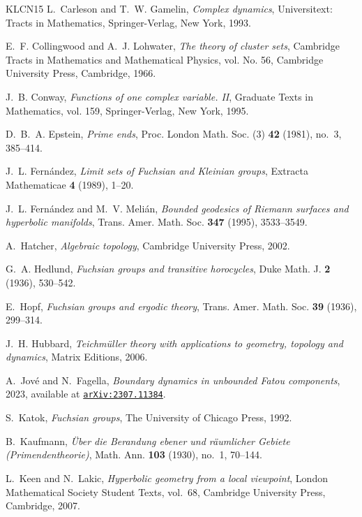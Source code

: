 \documentclass[11pt,a4paper,reqno]{amsart}
\theoremstyle{plain}
\theoremstyle{definition}
\theoremstyle{plain}
\begin{document}
\begin{thebibliography}{KLCN15}
L.~Carleson and T.~W. Gamelin, \emph{Complex dynamics}, Universitext: Tracts in
  Mathematics, Springer-Verlag, New York, 1993.

E.~F. Collingwood and A.~J. Lohwater, \emph{The theory of cluster sets},
  Cambridge Tracts in Mathematics and Mathematical Physics, vol. No. 56,
  Cambridge University Press, Cambridge, 1966.

J.~B. Conway, \emph{Functions of one complex variable. {II}}, Graduate Texts in
  Mathematics, vol. 159, Springer-Verlag, New York, 1995.

D.~B.~A. Epstein, \emph{Prime ends}, Proc. London Math. Soc. (3) \textbf{42}
  (1981), no.~3, 385--414.

J.~L. Fern{\'a}ndez, \emph{Limit sets of {F}uchsian and {K}leinian groups},
  Extracta Mathematicae \textbf{4} (1989), 1--20.

J.~L. Fern{\'a}ndez and M.~V. Meli{\'a}n, \emph{Bounded geodesics of {R}iemann
  surfaces and hyperbolic manifolds}, Trans. Amer. Math. Soc. \textbf{347}
  (1995), 3533--3549.

A.~Hatcher, \emph{Algebraic topology}, Cambridge University Press, 2002.

G.~A. Hedlund, \emph{Fuchsian groups and transitive horocycles}, Duke Math. J.
  \textbf{2} (1936), 530--542.

E.~Hopf, \emph{Fuchsian groups and ergodic theory}, Trans. Amer. Math. Soc.
  \textbf{39} (1936), 299--314.

J.~H. Hubbard, \emph{Teichm{\"u}ller theory with applications to geometry,
  topology and dynamics}, Matrix Editions, 2006.

A.~Jov{\'e} and N.~Fagella, \emph{Boundary dynamics in unbounded {F}atou
  components}, 2023, available at
  \href{https://arxiv.org/abs/2307.11384}{\texttt{arXiv:2307.11384}}.

S.~Katok, \emph{Fuchsian groups}, The University of Chicago Press, 1992.

B.~Kaufmann, \emph{\"{U}ber die {B}erandung ebener und r\"{a}umlicher {G}ebiete
  ({P}rimendentheorie)}, Math. Ann. \textbf{103} (1930), no.~1, 70--144.

L.~Keen and N.~Lakic, \emph{Hyperbolic geometry from a local viewpoint}, London
  Mathematical Society Student Texts, vol.~68, Cambridge University Press,
  Cambridge, 2007.


\end{thebibliography}
\end{document}

